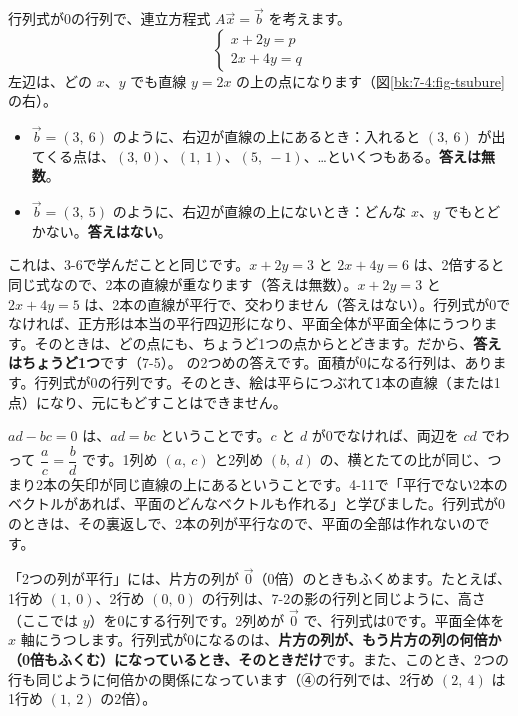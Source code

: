 行列式が0の行列で、連立方程式 $A\vec x=\vec b$ を考えます。
\[ \begin{cases} x+2y=p\\ 2x+4y=q \end{cases} \]
左辺は、どの $x$、$y$ でも直線 $y=2x$ の上の点になります（図\ref{bk:7-4:fig-tsubure}の右）。
\begin{itemize}[leftmargin=1.6\zw, itemsep=1pt, topsep=2pt, label={\color{\bkTT}●}]
\item $\vec b=(3,\ 6)$ のように、右辺が直線の上にあるとき：入れると $(3,\ 6)$ が出てくる点は、$(3,\ 0)$、$(1,\ 1)$、$(5,\ -1)$、…といくつもある。\textbf{答えは無数}。
\item $\vec b=(3,\ 5)$ のように、右辺が直線の上にないとき：どんな $x$、$y$ でもとどかない。\textbf{答えはない}。
\end{itemize}
これは、3-6で学んだことと同じです。$x+2y=3$ と $2x+4y=6$ は、2倍すると同じ式なので、2本の直線が重なります（答えは無数）。$x+2y=3$ と $2x+4y=5$ は、2本の直線が平行で、交わりません（答えはない）。行列式が0でなければ、正方形は本当の平行四辺形になり、平面全体が平面全体にうつります。そのときは、どの点にも、ちょうど1つの点からとどきます。だから、\textbf{答えはちょうど1つ}です（7-5）。
\bkhatenaref の2つめの答えです。面積が0になる行列は、あります。行列式が0の行列です。そのとき、絵は平らにつぶれて1本の直線（または1点）になり、元にもどすことはできません。


$ad-bc=0$ は、$ad=bc$ ということです。$c$ と $d$ が0でなければ、両辺を $cd$ でわって $\dfrac{a}{c}=\dfrac{b}{d}$ です。1列め $(a,\ c)$ と2列め $(b,\ d)$ の、横とたての比が同じ、つまり2本の矢印が同じ直線の上にあるということです。4-11で「平行でない2本のベクトルがあれば、平面のどんなベクトルも作れる」と学びました。行列式が0のときは、その裏返しで、2本の列が平行なので、平面の全部は作れないのです。

\begin{seikaku}
「2つの列が平行」には、片方の列が $\vec0$（0倍）のときもふくめます。たとえば、1行め $(1,\ 0)$、2行め $(0,\ 0)$ の行列は、7-2の影の行列と同じように、高さ（ここでは $y$）を0にする行列です。2列めが $\vec0$ で、行列式は0です。平面全体を $x$ 軸にうつします。行列式が0になるのは、\textbf{片方の列が、もう片方の列の何倍か（0倍もふくむ）になっているとき、そのときだけ}です。また、このとき、2つの行も同じように何倍かの関係になっています（④の行列では、2行め $(2,\ 4)$ は1行め $(1,\ 2)$ の2倍）。
\end{seikaku}

